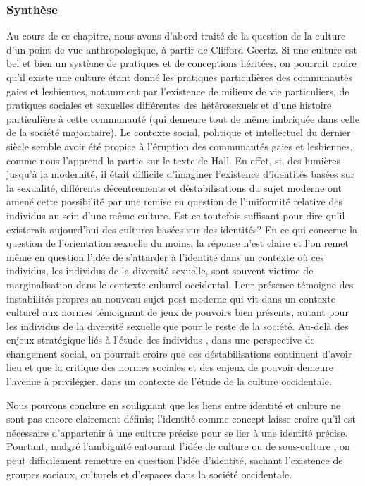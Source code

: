 \subsubsection{Synthèse}
\label{sec:synth_se} 
Au cours de ce chapitre, nous avons d'abord traité de la question de la culture d'un point de vue anthropologique, à partir de Clifford Geertz.
Si une culture est bel et bien un système de pratiques et de conceptions héritées, on pourrait croire qu'il existe une culture \lgbt{} étant donné les pratiques particulières des communautés gaies et lesbiennes, notamment par l'existence de milieux de vie particuliers, de pratiques sociales et sexuelles différentes des hétérosexuels et d'une histoire particulière à cette communauté (qui demeure tout de même imbriquée dans celle de la société majoritaire). 
Le contexte social, politique et intellectuel du dernier siècle semble avoir été propice à l'éruption des communautés gaies et lesbiennes, comme nous l'apprend la partie sur le texte de Hall. 
En effet, si, des lumières jusqu'à la modernité, il était difficile d'imaginer l'existence d'identités basées sur la sexualité, différents décentrements et déstabilisations du sujet moderne ont amené cette possibilité par une remise en question de l'uniformité relative des individus au sein d'une même culture. 
Est-ce toutefois suffisant pour dire qu'il existerait aujourd'hui des cultures basées sur des identités? 
En ce qui concerne la question de l'orientation sexuelle du moins, la réponse n'est claire et l'on remet même en question l'idée de s'attarder à l'identité dans un contexte où ces individus, les individus de la diversité sexuelle, sont souvent victime de marginalisation dans le contexte culturel occidental. 
Leur présence témoigne des instabilités propres au nouveau sujet post-moderne qui vit dans un contexte culturel aux normes témoignant de jeux de pouvoirs bien présents, autant pour les individus de la diversité sexuelle que pour le reste de la société. 
Au-delà des enjeux stratégique liés à l'étude des individus \lgbt{}, dans une perspective de changement social, on pourrait croire que ces déstabilisations continuent d'avoir lieu et que la critique des normes sociales et des enjeux de pouvoir demeure l'avenue à privilégier, dans un contexte de l'étude de la culture occidentale.

Nous pouvons conclure en soulignant que les liens entre identité et culture ne sont pas encore clairement définis; l'identité comme concept laisse croire qu'il est nécessaire d'appartenir à une culture précise pour se lier à une identité précise. 
Pourtant, malgré l'ambiguïté entourant l'idée de culture ou de sous-culture \lgbt{}, on peut difficilement remettre en question l'idée d'identité, sachant l'existence de groupes sociaux, culturels et d'espaces \lgbt{} dans la société occidentale.

